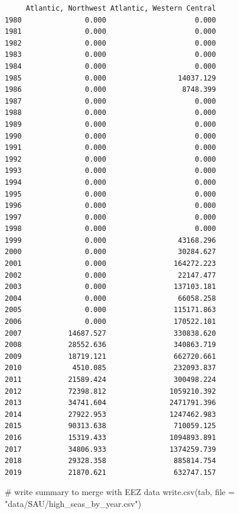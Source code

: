 \documentclass[
]{article}
\newenvironment{Shaded}{\begin{snugshade}}{\end{snugshade}}
\newcommand{\AttributeTok}[1]{\textcolor[rgb]{0.40,0.45,0.13}{#1}}
\newcommand{\CommentTok}[1]{\textcolor[rgb]{0.37,0.37,0.37}{#1}}
\newcommand{\FunctionTok}[1]{\textcolor[rgb]{0.28,0.35,0.67}{#1}}
\newcommand{\NormalTok}[1]{\textcolor[rgb]{0.00,0.23,0.31}{#1}}
\newcommand{\StringTok}[1]{\textcolor[rgb]{0.13,0.47,0.30}{#1}}
\begin{document}
\begin{verbatim}
     Atlantic, Northwest Atlantic, Western Central
1980               0.000                     0.000
1981               0.000                     0.000
1982               0.000                     0.000
1983               0.000                     0.000
1984               0.000                     0.000
1985               0.000                 14037.129
1986               0.000                  8748.399
1987               0.000                     0.000
1988               0.000                     0.000
1989               0.000                     0.000
1990               0.000                     0.000
1991               0.000                     0.000
1992               0.000                     0.000
1993               0.000                     0.000
1994               0.000                     0.000
1995               0.000                     0.000
1996               0.000                     0.000
1997               0.000                     0.000
1998               0.000                     0.000
1999               0.000                 43168.296
2000               0.000                 30284.627
2001               0.000                164272.223
2002               0.000                 22147.477
2003               0.000                137103.181
2004               0.000                 66058.258
2005               0.000                115171.863
2006               0.000                170522.101
2007           14687.527                330838.620
2008           28552.636                340863.719
2009           18719.121                662720.661
2010            4510.085                232093.837
2011           21589.424                300498.224
2012           72398.812               1059210.392
2013           34741.604               2471791.396
2014           27922.953               1247462.983
2015           90313.638                710059.125
2016           15319.433               1094893.891
2017           34806.933               1374259.739
2018           29328.358                885814.754
2019           21870.621                632747.157
\end{verbatim}

\begin{Shaded}
\begin{Highlighting}[]
\CommentTok{\# write summary to merge with EEZ data }
\FunctionTok{write.csv}\NormalTok{(tab, }\AttributeTok{file =} \StringTok{"data/SAU/high\_seas\_by\_year.csv"}\NormalTok{)}
\end{Highlighting}
\end{Shaded}
\end{document}
